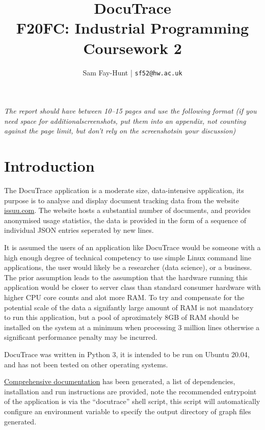 \documentclass[11pt]{article}
\begin{document}
\title{%
	\bf DocuTrace\\ 
    \large F20FC: Industrial Programming\\
    Coursework 2}

\author{
	Sam Fay-Hunt | \texttt{sf52@hw.ac.uk}
}

\maketitle
\thispagestyle{empty}
\pagebreak


\tableofcontents
\thispagestyle{empty}
\pagebreak


\setcounter{page}{1}

\emph{The report should have between 10–15 pages and use the following format (if you need space for additionalscreenshots, put them into an appendix, not counting against the page limit, but don’t rely on the screenshotsin your discussion)}

\section{Introduction}
The DocuTrace application is a moderate size, data-intensive application, its purpose is to analyse and display document tracking data from the website \href{https://issuu.com/}{issuu.com}. 
The website hosts a substantial number of documents, and provides anonymised usage statistics, the data is provided in the form of a sequence of individual JSON entries seperated by new lines.


It is assumed the users of an application like DocuTrace would be someone with a high enough degree of technical competency to use simple Linux command line applications, the user would likely be a researcher (data science), or a business. 
The prior assumption leads to the assumption that the hardware running this application would be closer to server class than standard consumer hardware with higher CPU core counts and alot more RAM.
To try and compensate for the potential scale of the data a signifantly large amount of RAM is not mandatory to run this application, but a pool of aproximately 8GB of RAM should be installed on the system at a minimum when processing 3 million lines otherwise a significant performance penalty may be incurred.


DocuTrace was written in Python 3, it is intended to be run on Ubuntu 20.04, and has not been tested on other operating systems.

\href{https://www2.macs.hw.ac.uk/~sf52/DocuTrace/html/index.html}{Comprehensive documentation} has been generated, a list of dependencies, installation and run instructions are provided, note the recommended entrypoint of the application is via the ``docutrace'' shell script, this script will automatically configure an environment variable to specify the output directory of graph files generated.
\end{document}
